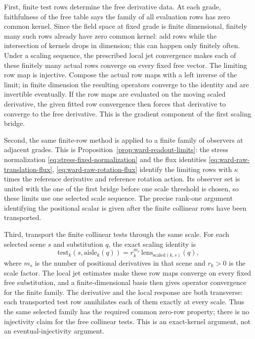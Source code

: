 First, finite test rows determine the free derivative data.  At each grade,
faithfulness of the free table says the family of all evaluation rows has
zero common kernel.  Since the field space at fixed grade is finite
dimensional, finitely many such rows already have zero common kernel: add
rows while the intersection of kernels drops in dimension; this can happen
only finitely often.  Under a scaling sequence, the prescribed local jet
convergence makes each of these finitely many actual rows converge on every
fixed free vector.  The limiting row map is injective.  Compose the actual
row maps with a left inverse of the limit; in finite dimension the resulting
operators converge to the identity and are invertible eventually.  If the
row maps are evaluated on the moving scaled derivative, the given fitted
row convergence then forces that derivative to converge to the free
derivative.  This is the gradient component of the first scaling bridge.

Second, the same finite-row method is applied to a finite family of
observers at adjacent grades.  This is
Proposition~\ref{prop:ward-readout-limits}: the stress normalization
\eqref{eq:stress-fixed-normalization} and the flux identities
\eqref{eq:ward-raw-translation-flux}, \eqref{eq:ward-raw-rotation-flux}
identify the limiting rows with $\kappa$ times the reference derivative and
reference rotation action.  Its observer set is united with the one of the
first bridge before one scale threshold is chosen, so these limits use one
selected scale sequence.  The precise
rank-one argument identifying the positional scalar is given after the
finite collinear rows have been transported.

Third, transport the finite collinear tests through the same scale.  For
each selected scene $s$ and substitution $q$, the exact scaling identity
is
\[
 \mathrm{test}_k\!\left(s,\mathrm{aisle}_k(q)\right)
   =r_k^{m_s}\,\mathrm{lens}_{\mathrm{scaled}(k,s)}(q),
\]
where $m_s$ is the number of positional derivatives in that scene and
$r_k>0$ is the scale factor.  The local jet estimates make these row maps
converge on every fixed free substitution, and a finite-dimensional basis
then gives operator convergence for the finite family.  The derivative and
the local response are both transverse: each transported test row
annihilates each of them exactly at every scale.  Thus the same selected
family has the required common zero-row property; there is no injectivity
claim for the free collinear tests.  This is an exact-kernel argument, not
an eventual-injectivity argument.

